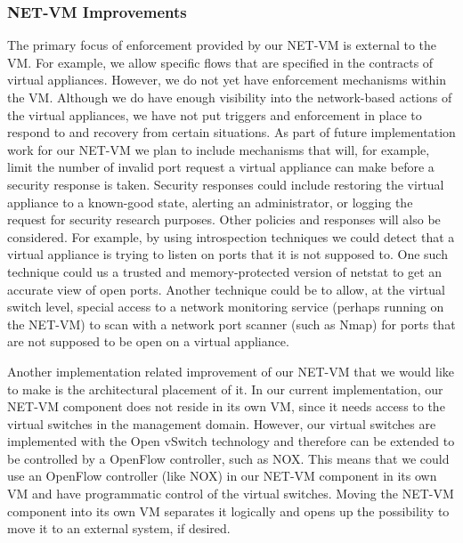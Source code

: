 \subsubsection{NET-VM Improvements}

The primary focus of enforcement provided by our NET-VM is external to the VM. For example, we allow specific flows that are specified in the contracts of virtual appliances. However, we do not yet have enforcement mechanisms within the VM. Although we do have enough visibility into the network-based actions of the virtual appliances, we have not put triggers and enforcement in place to respond to and recovery from certain situations. As part of future implementation work for our NET-VM we plan to include mechanisms that will, for example, limit the number of invalid port request a virtual appliance can make before a security response is taken. Security responses could include restoring the virtual appliance to a known-good state, alerting an administrator, or logging the request for security research purposes. Other policies and responses will also be considered. For example, by using introspection techniques we could detect that a virtual appliance is trying to listen on ports that it is not supposed to. One such technique could us a trusted and memory-protected version of netstat to get an accurate view of open ports. Another technique could be to allow, at the virtual switch level, special access to a network monitoring service (perhaps running on the NET-VM) to scan with a network port scanner (such as Nmap) for ports that are not supposed to be open on a virtual appliance.

Another implementation related improvement of our NET-VM that we would like to make is the architectural placement of it. In our current implementation, our NET-VM component does not reside in its own VM, since it needs access to the virtual switches in the management domain. However, our virtual switches are implemented with the Open vSwitch technology\cite{ovs_hotnets_2009} and therefore can be extended to be controlled by a OpenFlow\cite{mckeown_2008} controller, such as NOX\cite{gude_2008}. This means that we could use an OpenFlow controller (like NOX) in our NET-VM component in its own VM and have programmatic control of the virtual switches. Moving the NET-VM component into its own VM separates it logically and opens up the possibility to move it to an external system, if desired.

